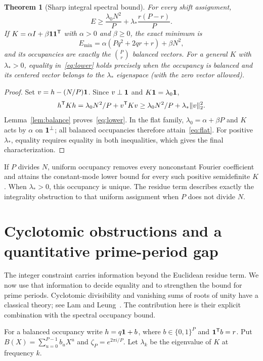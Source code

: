 \documentclass[11pt,a4paper]{article}
\newtheorem{theorem}{Theorem}\newtheorem{proposition}[theorem]{Proposition}\newtheorem{lemma}[theorem]{Lemma}\newtheorem{corollary}[theorem]{Corollary}\theoremstyle{definition}\newtheorem{definition}[theorem]{Definition}\newtheorem{example}[theorem]{Example}
\begin{document}
\begin{theorem}[Sharp integral spectral bound]\label{thm:occupancy}
For every shift assignment,
\begin{equation}\label{eq:lower}
 \boxed{E\ge\frac{\lambda_0N^2}{P}
              +\lambda_*\frac{r(P-r)}P.}
\end{equation}
If $K=\alpha I+\beta\mathbf 1\mathbf 1^\mathsf T$ with $\alpha>0$ and $\beta\ge0$,
the exact minimum is
\begin{equation}\label{eq:flat}
 E_{\min}=\alpha(Pq^2+2qr+r)+\beta N^2,
\end{equation}
and its occupancies are exactly the $\binom Pr$ balanced vectors.
For a general $K$ with $\lambda_*>0$, equality in~\eqref{eq:lower} holds
precisely when the occupancy is balanced and its centered vector belongs
to the $\lambda_*$ eigenspace (with the zero vector allowed).
\end{theorem}
\begin{proof}
Set $v=h-(N/P)\mathbf 1$. Since $v\perp\mathbf 1$ and $K\mathbf 1=\lambda_0\mathbf 1$,
\[
 h^\mathsf TKh=\lambda_0N^2/P+v^\mathsf TKv
 \ge\lambda_0N^2/P+\lambda_*\lVert v\rVert_2^2.
\]
Lemma~\ref{lem:balance} proves~\eqref{eq:lower}. In the flat family,
$\lambda_0=\alpha+\beta P$ and $K$ acts by $\alpha$ on $\mathbf 1^\perp$;
all balanced occupancies therefore attain~\eqref{eq:flat}.
For positive $\lambda_*$, equality requires equality in both inequalities,
which gives the final characterization.
\end{proof}

If $P$ divides $N$, uniform occupancy removes every nonconstant Fourier
coefficient and attains the constant-mode lower bound for every such
positive semidefinite $K$. When $\lambda_*>0$, this occupancy is unique.
The residue term describes exactly the integrality obstruction to that
uniform assignment when $P$ does not divide $N$.

\section{Cyclotomic obstructions and a quantitative prime-period gap}\label{sec:cyclotomic}
The integer constraint carries information beyond the Euclidean residue
term. We now use that information to decide equality and to strengthen
the bound for prime periods. Cyclotomic divisibility and vanishing sums
of roots of unity have a classical theory; see Lam and Leung~\cite{lamleung}.
The contribution here is their explicit combination with the spectral
occupancy bound.

For a balanced occupancy write $h=q\mathbf 1+b$, where
$b\in\{0,1\}^P$ and $\mathbf 1^\mathsf Tb=r$. Put
$B(X)=\sum_{u=0}^{P-1}b_uX^u$ and $\zeta_P=e^{2\pi i/P}$.
Let $\lambda_k$ be the eigenvalue of $K$ at frequency $k$.
\end{document}

